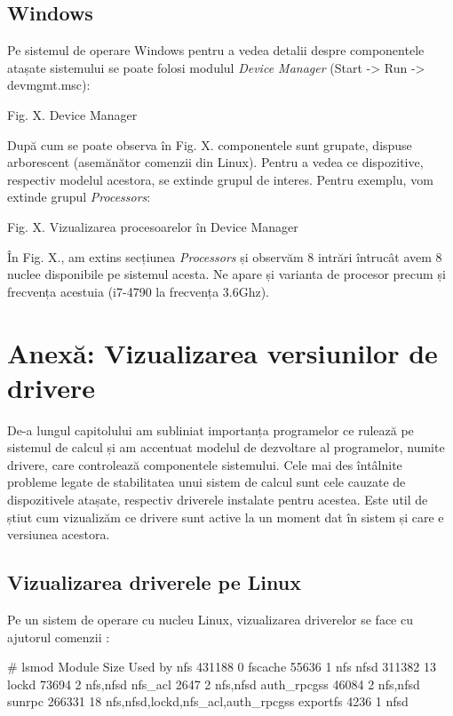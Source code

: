 \subsection{Windows}
\label{sec:hardware-virtualizare-windows}

Pe sistemul de operare Windows pentru a vedea detalii despre componentele
atașate sistemului se poate folosi modulul \textit{Device Manager} (Start -> Run
-> devmgmt.msc):

Fig. X. Device Manager

După cum se poate observa în Fig. X. componentele sunt grupate, dispuse
arborescent (asemănător comenzii  din Linux). Pentru a vedea ce dispozitive,
respectiv modelul acestora, se extinde grupul de interes. Pentru exemplu, vom
extinde grupul \textit{Processors}:

Fig. X. Vizualizarea procesoarelor în Device Manager


În Fig. X., am extins secțiunea \textit{Processors} și observăm 8 intrări întrucât avem 8
nuclee disponibile pe sistemul acesta. Ne apare și varianta de procesor precum
și frecvența acestuia (i7-4790 la frecvența 3.6Ghz).

\section{Anexă: Vizualizarea versiunilor de drivere}
\label{sec:hardware-virtualizare-driver}

De-a lungul capitolului am subliniat importanța programelor ce rulează pe
sistemul de calcul și am accentuat modelul de dezvoltare al programelor, numite
drivere, care controlează componentele sistemului. Cele mai des întâlnite
probleme legate de stabilitatea unui sistem de calcul sunt cele cauzate de
dispozitivele atașate, respectiv driverele instalate pentru acestea. Este util
de știut cum vizualizăm ce drivere sunt active la un moment dat în sistem și
care e versiunea acestora.

\subsection{Vizualizarea driverele pe Linux}
\label{sec:hardware-virtualizare-linux}

Pe un sistem de operare cu nucleu Linux, vizualizarea driverelor se face cu
ajutorul comenzii :

\begin{screen}
# lsmod
Module                  Size  Used by
nfs                   431188  0
fscache                55636  1 nfs
nfsd                  311382  13
lockd                  73694  2 nfs,nfsd
nfs_acl                 2647  2 nfs,nfsd
auth_rpcgss            46084  2 nfs,nfsd
sunrpc                266331  18 nfs,nfsd,lockd,nfs_acl,auth_rpcgss
exportfs                4236  1 nfsd
\end{screen}


